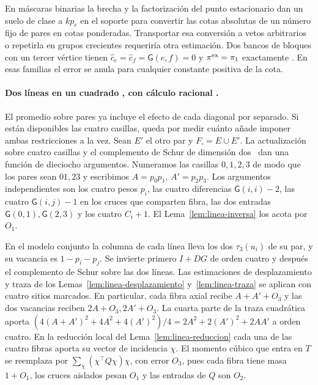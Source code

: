 En máscaras binarias la
brecha y la factorización del punto estacionario dan un suelo de clase a $kp_e$ en el soporte
para convertir las cotas absolutas de un número fijo de pares en cotas ponderadas. Transportar
esa conversión a vetos arbitrarios o repetirla en grupos crecientes requeriría otra estimación.
Dos bancos de bloques con un tercer vértice tienen $\hat c_e=\hat c_f=\mathsf G(e,f)=0$ y
$\pi^{\rm ex}=\pi_1$ exactamente . En esas familias el error se anula para cualquier
constante positiva de la cota.





\paragraph{Dos líneas en un cuadrado , con cálculo racional
.}\label{par:cuadrado-racional}
El promedio sobre pares ya incluye el efecto de cada diagonal por separado. Si están disponibles
las cuatro casillas, queda por medir cuánto añade imponer ambas restricciones a la vez. Sean
$E'$ el otro par y $F_\square=E\cup E'$. La actualización sobre cuatro casillas y el complemento de
Schur de dimensión dos~\cite{hj} dan una función de dieciocho argumentos. Numeramos
las casillas $0,1,2,3$ de modo que los pares sean $01,23$ y escribimos
$A=p_0p_1$, $A'=p_2p_3$. Los argumentos independientes son los cuatro pesos $p_i$,
las cuatro diferencias $\mathsf G(i,i)-2$, las cuatro $\mathsf G(i,j)-1$ en los cruces
que comparten fibra, las dos entradas $\mathsf G(0,1),\mathsf G(2,3)$ y los cuatro $C_i+1$.
El Lema~\ref{lem:linea-inversa} los acota por $O_1$.

En el modelo conjunto la columna de cada línea lleva los dos $\tau_3(u_i)$ de su par,
y su vacancia es $1-p_i-p_j$. Se invierte primero $I+DG$ de orden cuatro y después
el complemento de Schur sobre las dos líneas. Las estimaciones de desplazamiento y traza
de los Lemas~\ref{lem:linea-desplazamiento} y~\ref{lem:linea-traza} se aplican con cuatro
sitios marcados. En particular, cada fibra axial recibe $A+A'+O_3$ y las dos vacancias
reciben $2A+O_3,2A'+O_3$. La cuarta parte de la traza cuadrática aporta
$(4(A+A')^2+4A^2+4(A')^2)/4=2A^2+2(A')^2+2AA'$ a orden cuatro. En la reducción local
del Lema~\ref{lem:linea-reduccion} cada una de las cuatro fibras aporta su vector de incidencia
$\chi$. El momento cúbico que entra en $T$ se reemplaza por
$\sum_\chi(\chi^\top Q\chi)\chi$, con error $O_3$, pues cada fibra tiene masa $1+O_1$,
los cruces aislados pesan $O_1$ y las entradas de $Q$ son $O_2$.

